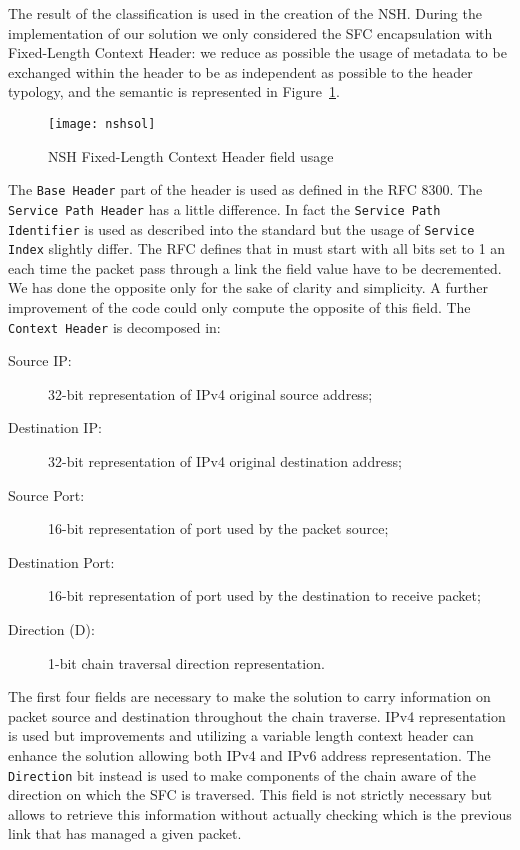 The result of the classification is used in the creation of the NSH. During the
implementation of our solution we only considered the SFC encapsulation with
Fixed-Length Context Header: we reduce as possible the usage of metadata to be
exchanged within the header to be as independent as possible to the header
typology, and the semantic is represented in Figure~\ref{chap:impl:img:nsh}.

\begin{figure}
  \centering \texttt{[image: nshsol]}
  \caption{NSH Fixed-Length Context Header field usage}
  \label{chap:impl:img:nsh}
\end{figure}

The \texttt{Base Header} part of the header is used as defined in the RFC 8300.
The \texttt{Service Path Header} has a little difference. In fact the 
\texttt{Service Path Identifier} is used as described into the standard but the
usage of \texttt{Service Index} slightly differ. The RFC defines that in must
start with all bits set to 1 an each time the packet pass through a link the
field value have to be decremented. We has done the opposite only for the sake
of clarity and simplicity. A further improvement of the code could only compute
the opposite of this field. The \texttt{Context Header} is decomposed in:
\begin{description}
  \item[Source IP:] 32-bit representation of IPv4 original source address;
  \item[Destination IP:] 32-bit representation of IPv4 original destination
  address;
  \item[Source Port:] 16-bit representation of port used by the packet source;
  \item[Destination Port:] 16-bit representation of port used by the destination
  to receive packet;
  \item[Direction (D):] 1-bit chain traversal direction representation.
\end{description}
The first four fields are necessary to make the solution to carry information on
packet source and destination throughout the chain traverse. IPv4
representation is used but improvements and utilizing a variable length context
header can enhance the solution allowing both IPv4 and IPv6 address
representation. The \texttt{Direction} bit instead is used to make components of
the chain aware of the direction on which the SFC is traversed. This field is
not strictly necessary but allows to retrieve this information without actually
checking which is the previous link that has managed a given packet. 

